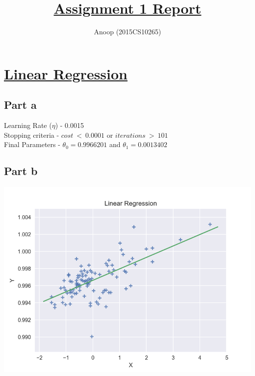 \documentclass[12pt]{article}
\title{\textbf{\underline{Assignment 1 Report}}}
\author{Anoop (2015CS10265)}
\begin{document}
\maketitle

\section*{\underline{Linear Regression}}
\subsection*{Part a}
\begin{addmargin}[0.3in]{0in}
Learning Rate ($\eta$) - 0.0015 \\
Stopping criteria - $cost\ <\ 0.0001$ or $iterations\ >\ 101$ \\
Final Parameters - $\theta_0 = 0.9966201$ and $\theta_1 = 0.0013402$
\end{addmargin}
\subsection*{Part b}
\begin{center}
\includegraphics[scale=0.5]{linear1.png}
\end{center}
\end{document}
